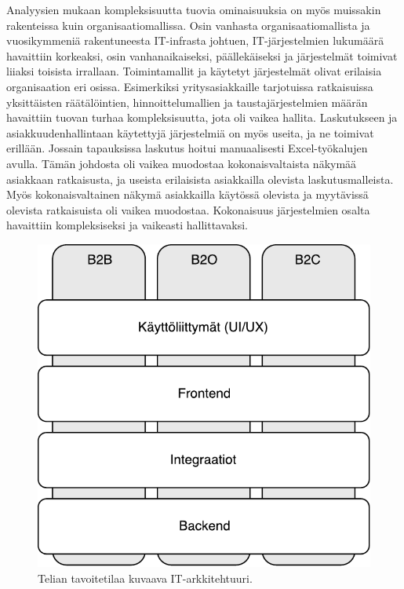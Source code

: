 \documentclass[finnish,12pt,a4paper,pdftex]{article}
\begin{document}
Analyysien mukaan kompleksisuutta tuovia ominaisuuksia on myös muissakin rakenteissa kuin organisaatiomallissa. Osin vanhasta organisaatiomallista ja vuosikymmeniä rakentuneesta IT-infrasta johtuen, IT-järjestelmien lukumäärä havaittiin korkeaksi, osin vanhanaikaiseksi, päällekäiseksi ja järjestelmät toimivat liiaksi toisista irrallaan. Toimintamallit ja käytetyt järjestelmät olivat erilaisia organisaation eri osissa. Esimerkiksi yritysasiakkaille tarjotuissa ratkaisuissa yksittäisten räätälöintien, hinnoittelumallien ja taustajärjestelmien määrän havaittiin tuovan turhaa kompleksisuutta, jota oli vaikea hallita. Laskutukseen ja asiakkuudenhallintaan käytettyjä järjestelmiä on myös useita, ja ne toimivat erillään. Jossain tapauksissa laskutus hoitui manuaalisesti Excel-työkalujen avulla. Tämän johdosta oli vaikea muodostaa kokonaisvaltaista näkymää asiakkaan ratkaisusta, ja useista erilaisista asiakkailla olevista laskutusmalleista. Myös kokonaisvaltainen näkymä asiakkailla käytössä olevista ja myytävissä olevista ratkaisuista oli vaikea muodostaa. Kokonaisuus järjestelmien osalta havaittiin kompleksiseksi ja vaikeasti hallittavaksi.\\

\begin{figure}[!h]
    \centering
    \includegraphics[scale=0.5]{images/ratkaisuarkkitehtuuri.pdf}
    \caption{Telian tavoitetilaa kuvaava IT-arkkitehtuuri.}
    \label{fig:ratkark}
\end{figure}
\end{document}
